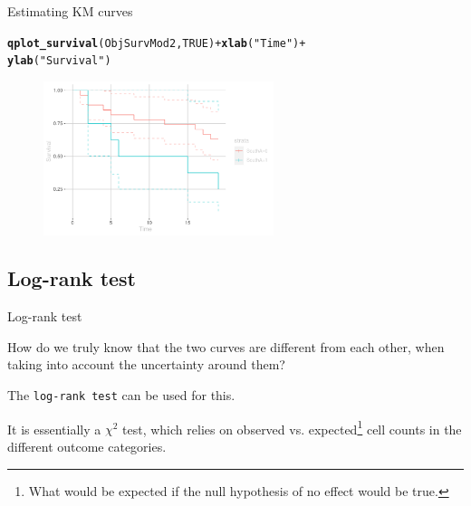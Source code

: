 \documentclass[12pt,english,pdf,xcolor=dvipsnames,aspectratio=169]{beamer}\usepackage[]{graphicx}\usepackage[]{xcolor}
\makeatletter
\newcommand{\hlnum}[1]{\textcolor[rgb]{0.686,0.059,0.569}{#1}}%
\newcommand{\hlstr}[1]{\textcolor[rgb]{0.192,0.494,0.8}{#1}}%
\newcommand{\hlopt}[1]{\textcolor[rgb]{0,0,0}{#1}}%
\newcommand{\hlstd}[1]{\textcolor[rgb]{0.345,0.345,0.345}{#1}}%
\newcommand{\hlkwd}[1]{\textcolor[rgb]{0.737,0.353,0.396}{\textbf{#1}}}%
\newenvironment{kframe}{%
 \def\at@end@of@kframe{}%
 \ifinner\ifhmode%
  \def\at@end@of@kframe{\end{minipage}}%
  \begin{minipage}{\columnwidth}%
 \fi\fi%
 \def\FrameCommand##1{\hskip\@totalleftmargin \hskip-\fboxsep
 \colorbox{shadecolor}{##1}\hskip-\fboxsep
     \hskip-\linewidth \hskip-\@totalleftmargin \hskip\columnwidth}%
 \MakeFramed {\advance\hsize-\width
   \@totalleftmargin\z@ \linewidth\hsize
   \@setminipage}}%
 {\par\unskip\endMakeFramed%
 \at@end@of@kframe}
\newenvironment{knitrout}{}{} %
\makeatother
\begin{document}
\begin{frame}[fragile]{Estimating KM curves}

\begin{knitrout}\scriptsize
{}\color{fgcolor}\begin{kframe}
\begin{alltt}
\hlkwd{qplot_survival}\hlstd{(ObjSurvMod2,} \hlnum{TRUE}\hlstd{)} \hlopt{+} \hlkwd{xlab}\hlstd{(}\hlstr{"Time"}\hlstd{)} \hlopt{+}
    \hlkwd{ylab}\hlstd{(}\hlstr{"Survival"}\hlstd{)}
\end{alltt}
\end{kframe}
\end{knitrout}



\begin{figure}[ht]
  \centering
  \includegraphics[width=0.6\textwidth]{../03-graphs/01-05.pdf}
\end{figure}

\end{frame}



\subsection{Log-rank test}

\begin{frame}{Log-rank test}

How do we truly know that the two curves are different from each other, when taking into account the uncertainty around them?\bigskip

The \texttt{log-rank test} can be used for this.\bigskip

It is essentially a $\chi^2$ test, which relies on observed vs. expected\footnote{What would be expected if the null hypothesis of no effect would be true.} cell counts in the different outcome categories.

\end{frame}
\end{document}
